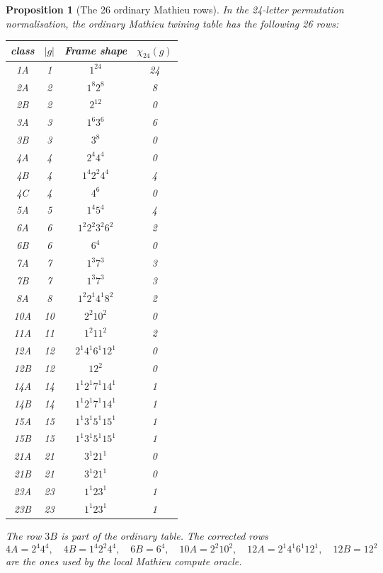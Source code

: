 \documentclass[11pt]{article}
\newtheorem{proposition}[theorem]{Proposition}
\begin{document}
\begin{proposition}[The 26 ordinary Mathieu rows]
\label{prop:m24-ordinary-26-rows}
In the 24-letter permutation normalisation, the ordinary Mathieu
twining table has the following 26 rows:
\begin{center}
\small
\begin{tabular}{c|c|c|c}
class & $|g|$ & Frame shape & $\chi_{24}(g)$\\
\hline
1A & 1 & $1^{24}$ & 24\\
2A & 2 & $1^8 2^8$ & 8\\
2B & 2 & $2^{12}$ & 0\\
3A & 3 & $1^6 3^6$ & 6\\
3B & 3 & $3^8$ & 0\\
4A & 4 & $2^4 4^4$ & 0\\
4B & 4 & $1^4 2^2 4^4$ & 4\\
4C & 4 & $4^6$ & 0\\
5A & 5 & $1^4 5^4$ & 4\\
6A & 6 & $1^2 2^2 3^2 6^2$ & 2\\
6B & 6 & $6^4$ & 0\\
7A & 7 & $1^3 7^3$ & 3\\
7B & 7 & $1^3 7^3$ & 3\\
8A & 8 & $1^2 2^1 4^1 8^2$ & 2\\
10A & 10 & $2^2 10^2$ & 0\\
11A & 11 & $1^2 11^2$ & 2\\
12A & 12 & $2^1 4^1 6^1 12^1$ & 0\\
12B & 12 & $12^2$ & 0\\
14A & 14 & $1^1 2^1 7^1 14^1$ & 1\\
14B & 14 & $1^1 2^1 7^1 14^1$ & 1\\
15A & 15 & $1^1 3^1 5^1 15^1$ & 1\\
15B & 15 & $1^1 3^1 5^1 15^1$ & 1\\
21A & 21 & $3^1 21^1$ & 0\\
21B & 21 & $3^1 21^1$ & 0\\
23A & 23 & $1^1 23^1$ & 1\\
23B & 23 & $1^1 23^1$ & 1
\end{tabular}
\end{center}
The row \(3B\) is part of the ordinary table.  The corrected rows
\[
4A=2^4 4^4,\quad
4B=1^4 2^2 4^4,\quad
6B=6^4,\quad
10A=2^2 10^2,\quad
12A=2^1 4^1 6^1 12^1,\quad
12B=12^2
\]
are the ones used by the local Mathieu compute oracle.
\end{proposition}
\end{document}
